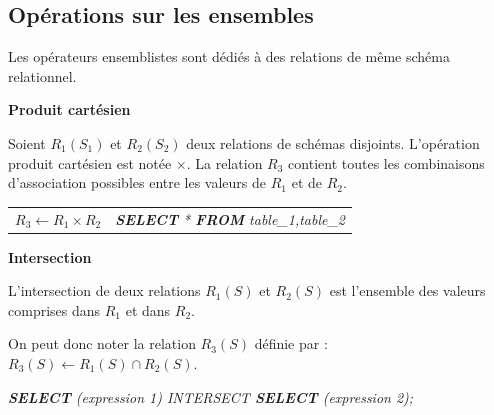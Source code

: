 \documentclass[10pt,fleqn]{article} %
\begin{document}
\subsection*{Opérations sur les ensembles}
Les opérateurs ensemblistes sont dédiés à des relations de même schéma relationnel. 

\begin{defi}

\textbf{Produit cartésien}

Soient $R_1(S_1)$ et $R_2(S_2)$ deux relations de schémas disjoints. L'opération produit cartésien est notée $\times$. La relation $R_3$ contient toutes les combinaisons d'association possibles entre les valeurs de $R_1$ et de $R_2$.

\begin{center}
\begin{tabular}{cc}
$R_3 \leftarrow R_1 \times R_2$ & 
\textsl{\textbf{SELECT} * \textbf{FROM} table\_1,table\_2}
\end{tabular}
\end{center}
\end{defi}


%
%
%
%
%
%
%
%
%
%
%
%




\begin{defi}

\textbf{Intersection}

L'intersection de deux relations $R_1(S)$ et $R_2(S)$ est l'ensemble des valeurs comprises dans $R_1$ et dans $R_2$. 

On peut donc noter la relation $R_3(S)$ définie par : $R_3(S)\leftarrow R_1(S)\cap R_2(S)$.

\textsl{\textbf{SELECT}  (expression 1) INTERSECT \textbf{SELECT} (expression 2);}
\end{defi}
\end{document}
